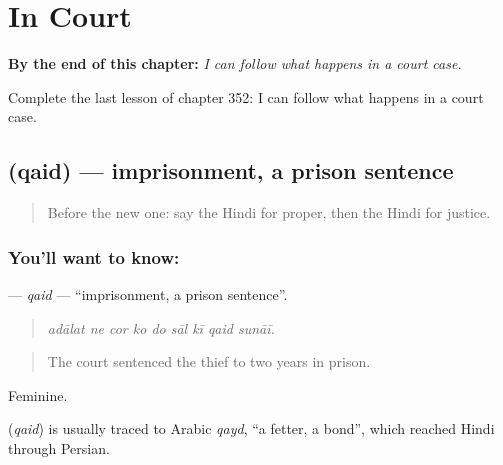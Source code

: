 
\chapter{In Court}
\label{ch:hi-in-court}

\begin{chapteropening}
\textbf{By the end of this chapter:} \emph{I can follow what happens in a court case.}

Complete the last lesson of chapter 352: I can follow what happens in a court case.
\end{chapteropening}

\section[\texorpdfstring{\hi{क़ैद} (qaid)}{क़ैद (qaid)}]{ (qaid) — imprisonment, a prison sentence}

\label{lesson:HI-C352-qaid}



\begin{quote}
Before the new one: say the Hindi for proper, then the Hindi for justice.
\end{quote}

\subsection*{You'll want to know: }
\textbf{} — \emph{qaid} — \textquotedblleft{}imprisonment, a prison sentence\textquotedblright{}.

\begin{quote}
        
\end{quote}

\begin{quote}
\emph{adālat ne cor ko do sāl kī qaid sunāī.}
\end{quote}

\begin{quote}
The court sentenced the thief to two years in prison.
\end{quote}

Feminine.

\begin{cousinweb}
\textbf{} (\emph{qaid}) is usually traced to Arabic \emph{qayd}, \textquotedblleft{}a fetter, a bond\textquotedblright{}, which reached Hindi through Persian.
\end{cousinweb}

